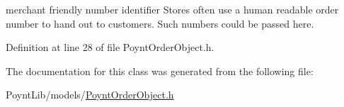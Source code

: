 merchant friendly number identifier  Stores often use a human readable order number to hand out to customers. Such numbers could be passed here. 



Definition at line 28 of file Poynt\+Order\+Object.\+h.



The documentation for this class was generated from the following file\+:\begin{DoxyCompactItemize}
\item 
Poynt\+Lib/models/\hyperlink{_poynt_order_object_8h}{Poynt\+Order\+Object.\+h}\end{DoxyCompactItemize}
